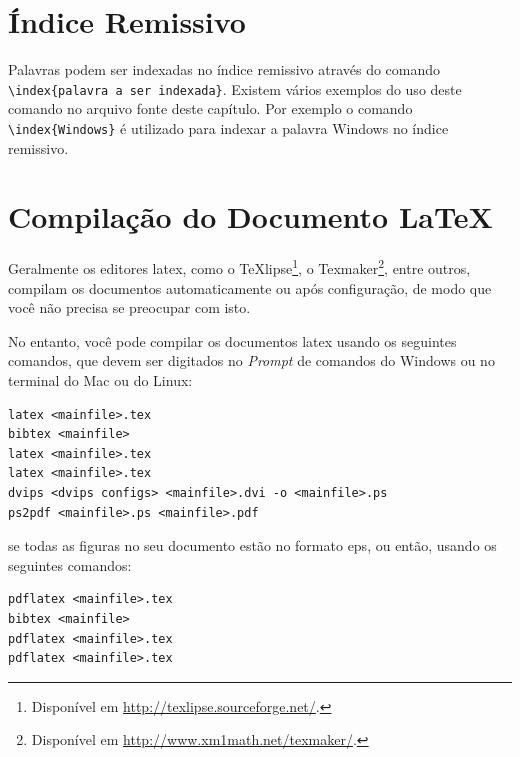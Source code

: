 \section{Índice Remissivo}\label{sec:indice}

Palavras podem ser indexadas no índice remissivo através do comando \verb|\index{palavra a ser indexada}|. Existem vários exemplos do uso deste comando no arquivo fonte deste capítulo. Por exemplo o comando \verb|\index{Windows}| é utilizado para indexar a palavra Windows no índice remissivo.

\section{Compilação do Documento \LaTeX}\label{sec:compilar}

Geralmente os editores \gls{latex}, como o TeXlipse\footnote{Disponível em \url{http://texlipse.sourceforge.net/}.}, o Texmaker\footnote{Disponível em \url{http://www.xm1math.net/texmaker/}.}, entre outros, compilam os documentos automaticamente ou após configuração, de modo que você não precisa se preocupar com isto.

No entanto, você pode compilar os documentos \gls{latex} usando os seguintes comandos, que devem ser digitados no \textit{Prompt} de comandos do Windows ou no terminal do Mac ou do Linux:

\begin{SingleSpacing}%
\begin{verbatim}
latex <mainfile>.tex
bibtex <mainfile>
latex <mainfile>.tex
latex <mainfile>.tex
dvips <dvips configs> <mainfile>.dvi -o <mainfile>.ps
ps2pdf <mainfile>.ps <mainfile>.pdf
\end{verbatim}
\end{SingleSpacing}

\noindent se todas as figuras no seu documento estão no formato \gls{eps}, ou então, usando os seguintes comandos:

\begin{SingleSpacing}%
\begin{verbatim}
pdflatex <mainfile>.tex
bibtex <mainfile>
pdflatex <mainfile>.tex
pdflatex <mainfile>.tex
\end{verbatim}
\end{SingleSpacing}

